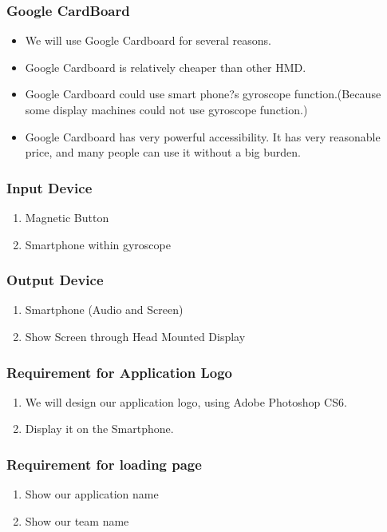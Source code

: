\documentclass[12pt]{article}
\begin{document}
\subsubsection{Google CardBoard}

\begin{itemize}
\item We will use Google Cardboard for several reasons.
\item Google Cardboard is relatively cheaper than other HMD.
\item Google Cardboard could use smart phone?s gyroscope function.(Because some display machines could not use gyroscope function.)
\item Google Cardboard has very powerful accessibility. It has very reasonable price, and many people can use it without a big burden.
\end{itemize}

\subsubsection{Input Device}
\begin{enumerate}
\item Magnetic Button
\item Smartphone within gyroscope
\end{enumerate}

\subsubsection{Output Device}
\begin{enumerate}
\item Smartphone (Audio and Screen)
\item Show Screen through Head Mounted Display
\end{enumerate}

\subsubsection{Requirement for Application Logo}
\begin{enumerate}
\item We will design our application logo, using Adobe Photoshop CS6.
\item Display it on the Smartphone.
\end{enumerate}

\subsubsection{Requirement for loading page}
\begin{enumerate}
\item Show our application name
\item Show our team name
\end{enumerate}
\end{document}
